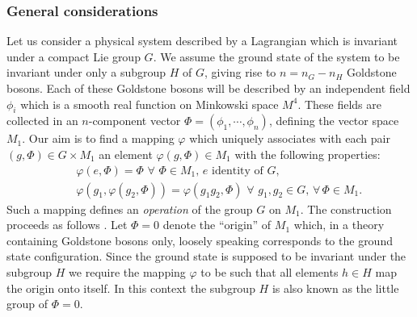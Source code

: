 \documentclass[twoside,12pt]{article}
\begin{document}
\subsubsection{General considerations}
\label{subsec_gc}
   Let us consider a physical system described by a Lagrangian which
is invariant under a compact Lie group $G$.
   We assume the ground state of the system to be invariant under
only a subgroup $H$ of $G$, giving rise to $n=n_G-n_H$ Goldstone bosons.
   Each of these Goldstone bosons will be described by an independent
field $\phi_i$ which is a smooth real function on Minkowski space
$M^4$.
   These fields are collected in an $n$-component vector $\Phi=(\phi_1,\cdots,\phi_n)$, defining the
vector space $M_1$.
   Our aim is to find a mapping $\varphi$ which uniquely associates with each
pair $(g,\Phi)\in G\times M_1$ an element $\varphi(g,\Phi)\in M_1$ with
the following properties:
\begin{eqnarray}
\label{4:2:condmap1}
&&\varphi(e,\Phi)=\Phi\,\,\forall\,\,\Phi\in M_1,\, e\,\,
\mbox{identity of}\,\, G,\\
\label{4:2:condmap2}
&&\varphi(g_1,\varphi(g_2,\Phi))=\varphi(g_1 g_2,\Phi)\,\,\forall\,\,
g_1,g_2\in G,\,\forall\,\Phi\in M_1.
\end{eqnarray}
   Such a mapping defines an {\em operation} of the group $G$ on $M_1$.
   The construction proceeds as follows \cite{Leutwyler:1991mz:2:2}.
   Let $\Phi=0$ denote the ``origin'' of $M_1$  which,
in a theory containing Goldstone bosons only, loosely speaking corresponds
to the ground state configuration.
   Since the ground state is supposed to be invariant under the subgroup
$H$ we require the mapping $\varphi$ to be such that all elements
$h\in H$ map the origin onto itself.
   In this context the subgroup $H$ is also known as the little group of
$\Phi=0$.
\end{document}

